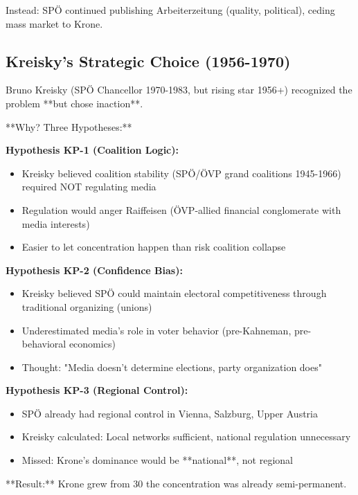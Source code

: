 Instead: SPÖ continued publishing Arbeiterzeitung (quality, political), ceding mass market to Krone.

\subsection*{Kreisky's Strategic Choice (1956-1970)}

Bruno Kreisky (SPÖ Chancellor 1970-1983, but rising star 1956+) recognized the problem **but chose inaction**.

**Why? Three Hypotheses:**

\textbf{Hypothesis KP-1 (Coalition Logic):}
\begin{itemize}
\item Kreisky believed coalition stability (SPÖ/ÖVP grand coalitions 1945-1966) required NOT regulating media
\item Regulation would anger Raiffeisen (ÖVP-allied financial conglomerate with media interests)
\item Easier to let concentration happen than risk coalition collapse
\end{itemize}

\textbf{Hypothesis KP-2 (Confidence Bias):}
\begin{itemize}
\item Kreisky believed SPÖ could maintain electoral competitiveness through traditional organizing (unions)
\item Underestimated media's role in voter behavior (pre-Kahneman, pre-behavioral economics)
\item Thought: "Media doesn't determine elections, party organization does"
\end{itemize}

\textbf{Hypothesis KP-3 (Regional Control):}
\begin{itemize}
\item SPÖ already had regional control in Vienna, Salzburg, Upper Austria
\item Kreisky calculated: Local networks sufficient, national regulation unnecessary
\item Missed: Krone's dominance would be **national**, not regional
\end{itemize}

**Result:** Krone grew from 30%
the concentration was already semi-permanent.


